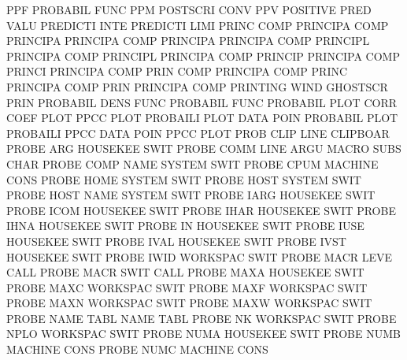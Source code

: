 PPF                                     PROBABIL FUNC
PPM                                     POSTSCRI CONV
PPV                                     POSITIVE PRED VALU
PREDICTI INTE                           PREDICTI LIMI
PRINC    COMP                           PRINCIPA COMP
PRINCIPA                                PRINCIPA COMP
PRINCIPA                                PRINCIPA COMP
PRINCIPL                                PRINCIPA COMP
PRINCIPL                                PRINCIPA COMP
PRINCIP                                 PRINCIPA COMP
PRINCI                                  PRINCIPA COMP
PRIN     COMP                           PRINCIPA COMP
PRINC                                   PRINCIPA COMP
PRIN                                    PRINCIPA COMP
PRINTING WIND                           GHOSTSCR PRIN
PROBABIL DENS FUNC                      PROBABIL FUNC
PROBABIL PLOT CORR COEF PLOT            PPCC     PLOT
PROBAILI PLOT DATA POIN                 PROBABIL PLOT
PROBAILI PPCC DATA POIN                 PPCC     PLOT
PROB     CLIP LINE                      CLIPBOAR
PROBE    ARG                            HOUSEKEE SWIT
PROBE    COMM LINE ARGU                 MACRO    SUBS CHAR
PROBE    COMP NAME                      SYSTEM   SWIT
PROBE    CPUM                           MACHINE  CONS
PROBE    HOME                           SYSTEM   SWIT
PROBE    HOST                           SYSTEM   SWIT
PROBE    HOST NAME                      SYSTEM   SWIT
PROBE    IARG                           HOUSEKEE SWIT
PROBE    ICOM                           HOUSEKEE SWIT
PROBE    IHAR                           HOUSEKEE SWIT
PROBE    IHNA                           HOUSEKEE SWIT
PROBE    IN                             HOUSEKEE SWIT
PROBE    IUSE                           HOUSEKEE SWIT
PROBE    IVAL                           HOUSEKEE SWIT
PROBE    IVST                           HOUSEKEE SWIT
PROBE    IWID                           WORKSPAC SWIT
PROBE    MACR LEVE                      CALL
PROBE    MACR SWIT                      CALL
PROBE    MAXA                           HOUSEKEE SWIT
PROBE    MAXC                           WORKSPAC SWIT
PROBE    MAXF                           WORKSPAC SWIT
PROBE    MAXN                           WORKSPAC SWIT
PROBE    MAXW                           WORKSPAC SWIT
PROBE    NAME TABL                      NAME     TABL
PROBE    NK                             WORKSPAC SWIT
PROBE    NPLO                           WORKSPAC SWIT
PROBE    NUMA                           HOUSEKEE SWIT
PROBE    NUMB                           MACHINE  CONS
PROBE    NUMC                           MACHINE  CONS
